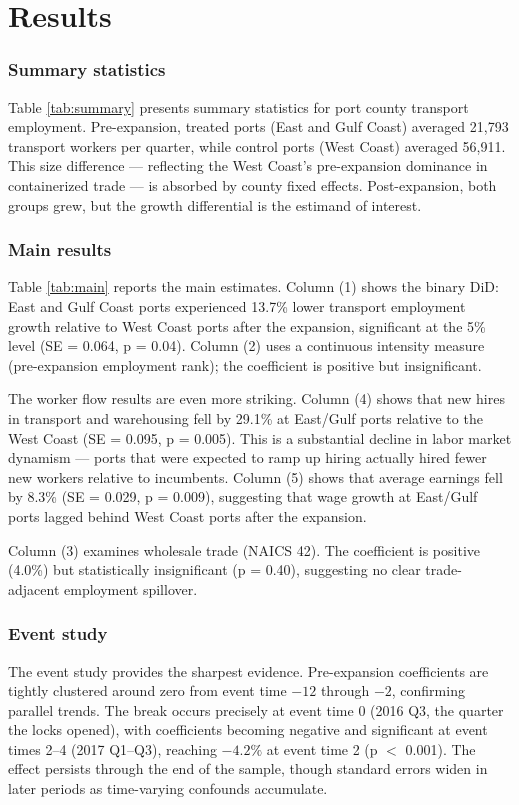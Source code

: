 \documentclass[12pt]{article}
\begin{document}
\section{Results}

\subsubsection*{Summary statistics} Table \ref{tab:summary} presents summary statistics for port county transport employment. Pre-expansion, treated ports (East and Gulf Coast) averaged 21,793 transport workers per quarter, while control ports (West Coast) averaged 56,911. This size difference --- reflecting the West Coast's pre-expansion dominance in containerized trade --- is absorbed by county fixed effects. Post-expansion, both groups grew, but the growth differential is the estimand of interest.



\subsubsection*{Main results} Table \ref{tab:main} reports the main estimates. Column (1) shows the binary DiD: East and Gulf Coast ports experienced 13.7\% lower transport employment growth relative to West Coast ports after the expansion, significant at the 5\% level (SE = 0.064, p = 0.04). Column (2) uses a continuous intensity measure (pre-expansion employment rank); the coefficient is positive but insignificant.

The worker flow results are even more striking. Column (4) shows that new hires in transport and warehousing fell by 29.1\% at East/Gulf ports relative to the West Coast (SE = 0.095, p = 0.005). This is a substantial decline in labor market dynamism --- ports that were expected to ramp up hiring actually hired fewer new workers relative to incumbents. Column (5) shows that average earnings fell by 8.3\% (SE = 0.029, p = 0.009), suggesting that wage growth at East/Gulf ports lagged behind West Coast ports after the expansion.

Column (3) examines wholesale trade (NAICS 42). The coefficient is positive (4.0\%) but statistically insignificant (p = 0.40), suggesting no clear trade-adjacent employment spillover.



\subsubsection*{Event study} The event study provides the sharpest evidence. Pre-expansion coefficients are tightly clustered around zero from event time $-12$ through $-2$, confirming parallel trends. The break occurs precisely at event time 0 (2016 Q3, the quarter the locks opened), with coefficients becoming negative and significant at event times 2--4 (2017 Q1--Q3), reaching $-4.2\%$ at event time 2 (p $<$ 0.001). The effect persists through the end of the sample, though standard errors widen in later periods as time-varying confounds accumulate.
\end{document}
